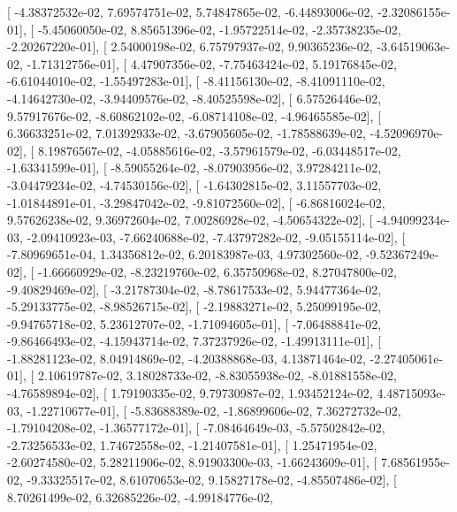\documentclass{article}
\begin{document}
       [ -4.38372532e-02,   7.69574751e-02,   5.74847865e-02,
         -6.44893006e-02,  -2.32086155e-01],
       [ -5.45060050e-02,   8.85651396e-02,  -1.95722514e-02,
         -2.35738235e-02,  -2.20267220e-01],
       [  2.54000198e-02,   6.75797937e-02,   9.90365236e-02,
         -3.64519063e-02,  -1.71312756e-01],
       [  4.47907356e-02,  -7.75463424e-02,   5.19176845e-02,
         -6.61044010e-02,  -1.55497283e-01],
       [ -8.41156130e-02,  -8.41091110e-02,  -4.14642730e-02,
         -3.94409576e-02,  -8.40525598e-02],
       [  6.57526446e-02,   9.57917676e-02,  -8.60862102e-02,
         -6.08714108e-02,  -4.96465585e-02],
       [  6.36633251e-02,   7.01392933e-02,  -3.67905605e-02,
         -1.78588639e-02,  -4.52096970e-02],
       [  8.19876567e-02,  -4.05885616e-02,  -3.57961579e-02,
         -6.03448517e-02,  -1.63341599e-01],
       [ -8.59055264e-02,  -8.07903956e-02,   3.97284211e-02,
         -3.04479234e-02,  -4.74530156e-02],
       [ -1.64302815e-02,   3.11557703e-02,  -1.01844891e-01,
         -3.29847042e-02,  -9.81072560e-02],
       [ -6.86816024e-02,   9.57626238e-02,   9.36972604e-02,
          7.00286928e-02,  -4.50654322e-02],
       [ -4.94099234e-03,  -2.09410923e-03,  -7.66240688e-02,
         -7.43797282e-02,  -9.05155114e-02],
       [ -7.80969651e-04,   1.34356812e-02,   6.20183987e-03,
          4.97302560e-02,  -9.52367249e-02],
       [ -1.66660929e-02,  -8.23219760e-02,   6.35750968e-02,
          8.27047800e-02,  -9.40829469e-02],
       [ -3.21787304e-02,  -8.78617533e-02,   5.94477364e-02,
         -5.29133775e-02,  -8.98526715e-02],
       [ -2.19883271e-02,   5.25099195e-02,  -9.94765718e-02,
          5.23612707e-02,  -1.71094605e-01],
       [ -7.06488841e-02,  -9.86466493e-02,  -4.15943714e-02,
          7.37237926e-02,  -1.49913111e-01],
       [ -1.88281123e-02,   8.04914869e-02,  -4.20388868e-03,
          4.13871464e-02,  -2.27405061e-01],
       [  2.10619787e-02,   3.18028733e-02,  -8.83055938e-02,
         -8.01881558e-02,  -4.76589894e-02],
       [  1.79190335e-02,   9.79730987e-02,   1.93452124e-02,
          4.48715093e-03,  -1.22710677e-01],
       [ -5.83688389e-02,  -1.86899606e-02,   7.36272732e-02,
         -1.79104208e-02,  -1.36577172e-01],
       [ -7.08464649e-03,  -5.57502842e-02,  -2.73256533e-02,
          1.74672558e-02,  -1.21407581e-01],
       [  1.25471954e-02,  -2.60274580e-02,   5.28211906e-02,
          8.91903300e-03,  -1.66243609e-01],
       [  7.68561955e-02,  -9.33325517e-02,   8.61070653e-02,
          9.15827178e-02,  -4.85507486e-02],
       [  8.70261499e-02,   6.32685226e-02,  -4.99184776e-02,
\end{document}
